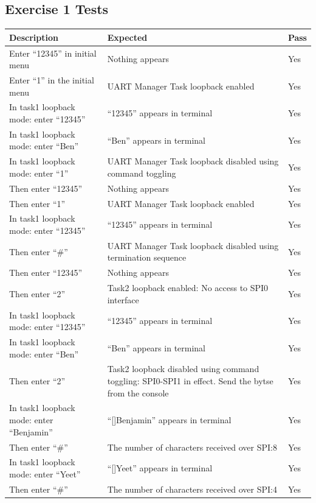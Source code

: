 \documentclass[11pt, letterpaper, titlepage]{article}
\begin{document}
\subsection{Exercise 1 Tests}
\begin{tabularx}{\textwidth}{|X|X|m|}
  \caption{Tests for exercise 1.} \\
  \hline
  \textbf{Description} & \textbf{Expected} & \textbf{Pass} \\ \hline
  Enter ``12345'' in initial menu & Nothing appears & Yes \\ \hline
  Enter ``1'' in the initial menu & UART Manager Task loopback enabled & Yes \\ \hline
  In task1 loopback mode: enter ``12345'' & ``12345'' appears in terminal & Yes \\ \hline
  In task1 loopback mode: enter ``Ben'' & ``Ben'' appears in terminal & Yes \\ \hline
  In task1 loopback mode: enter ``1'' & UART Manager Task loopback disabled using command toggling & Yes \\ \hline
  Then enter ``12345'' & Nothing appears & Yes \\ \hline
  Then enter ``1'' & UART Manager Task loopback enabled & Yes \\ \hline
  In task1 loopback mode: enter ``12345'' & ``12345'' appears in terminal & Yes \\ \hline
  Then enter ``\#'' & UART Manager Task loopback disabled using termination sequence & Yes \\ \hline
  Then enter ``12345'' & Nothing appears & Yes \\ \hline
  Then enter ``2'' & Task2 loopback enabled: No access to SPI0 interface & Yes \\ \hline
  In task1 loopback mode: enter ``12345'' & ``12345'' appears in terminal & Yes \\ \hline
  In task1 loopback mode: enter ``Ben'' & ``Ben'' appears in terminal & Yes \\ \hline
  Then enter ``2'' & Task2 loopback disabled using command toggling: SPI0-SPI1 in effect. Send the bytse from the console & Yes \\ \hline
  In task1 loopback mode: enter ``Benjamin'' & ``[]Benjamin'' appears in terminal & Yes \\ \hline
  Then enter ``\#'' & The number of characters received over SPI:8 & Yes \\ \hline
  In task1 loopback mode: enter ``Yeet'' & ``[]Yeet'' appears in terminal & Yes \\ \hline
  Then enter ``\#'' & The number of characters received over SPI:4 & Yes \\ \hline
\end{tabularx}
\end{document}
